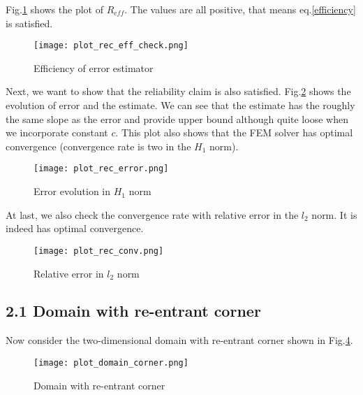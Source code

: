 \documentclass[11pt, letterpaper, hidelinks]{article}
\theoremstyle{definition}
\begin{document}
Fig.\ref{fig:rec_eff_check} shows the plot of $R_{eff}$. The values are all positive, that means eq.\ref{efficiency} is satisfied.

\begin{figure}[H]
    \texttt{[image: plot\_rec\_eff\_check.png]}
    \centering
    \caption{Efficiency of error estimator}
    \label{fig:rec_eff_check}
\end{figure}

Next, we want to show that the reliability claim is also satisfied. Fig.\ref{fig:rec_error} shows the evolution of error and the estimate. We can see that the estimate has the roughly the same slope as the error and provide upper bound although quite loose when we incorporate constant $c$. This plot also shows that the FEM solver has optimal convergence (convergence rate is two in the $H_1$ norm).

\begin{figure}[H]
    \texttt{[image: plot\_rec\_error.png]}
    \centering
    \caption{Error evolution in $H_1$ norm}
    \label{fig:rec_error}
\end{figure}

At last, we also check the convergence rate with relative error in the $l_2$ norm. It is indeed has optimal convergence.

\begin{figure}[H]
    \texttt{[image: plot\_rec\_conv.png]}
    \centering
    \caption{Relative error in $l_2$ norm}
    \label{fig:room_plan}
\end{figure}

\subsection{2.1 Domain with re-entrant corner}
Now consider the two-dimensional domain with re-entrant corner shown in Fig.\ref{fig:domain_corner}.

\begin{figure}[H]
    \texttt{[image: plot\_domain\_corner.png]}
    \centering
    \caption{Domain with re-entrant corner}
    \label{fig:domain_corner}
\end{figure}
\end{document}

